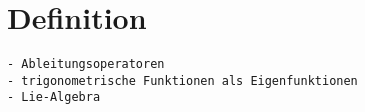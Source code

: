 %
%
%
\section{Definition
\label{buch:opertoren:section:definition}}

\begin{verbatim}
- Ableitungsoperatoren
- trigonometrische Funktionen als Eigenfunktionen
- Lie-Algebra
\end{verbatim}
